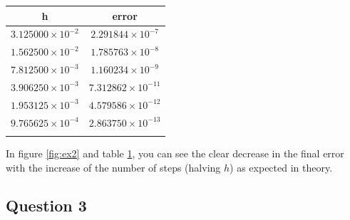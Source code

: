 \documentclass[a4paper, 11pt]{article}
\begin{document}
		\begin{table}[H]
			\centering
			\begin{tabular}{c|c}
				\textbf{h}& \textbf{error}   \\ \hline
				$ 3.125000\times 10^{-2} $ & $ 2.291844\times 10^{-7} $ \\ \hline
				$ 1.562500\times 10^{-2} $ & $ 1.785763\times 10^{-8} $ \\ \hline
				$ 7.812500\times 10^{-3} $ & $ 1.160234\times 10^{-9} $ \\ \hline
				$ 3.906250\times 10^{-3} $ & $ 7.312862\times 10^{-11} $ \\ \hline
				$ 1.953125\times 10^{-3} $ & $ 4.579586\times 10^{-12} $ \\ \hline
				$ 9.765625\times 10^{-4} $ & $ 2.863750\times 10^{-13} $ \\ \hline
				\label{table:ex2}
			\end{tabular}
		\end{table}
	
		In figure \ref{fig:ex2} and table \ref{table:ex2}, you can see the clear decrease in the final error with the increase of the number of steps (halving $h$) as expected in theory.		
		
		\subsection*{Question 3}
\end{document}
